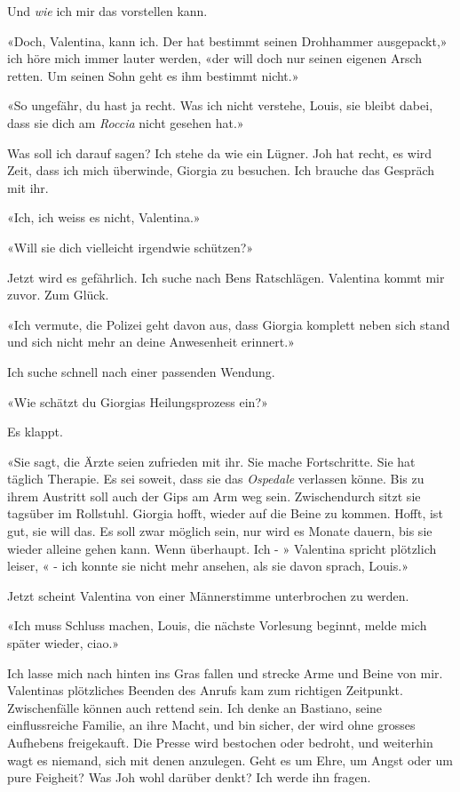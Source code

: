 Und \emph{wie} ich mir das vorstellen kann.

«Doch, Valentina, kann ich. Der hat bestimmt seinen Drohhammer
ausgepackt,» ich höre mich immer lauter werden, «der will doch nur
seinen eigenen Arsch retten. Um seinen Sohn geht es ihm bestimmt nicht.»

«So ungefähr, du hast ja recht. Was ich nicht verstehe, Louis, sie
bleibt dabei, dass sie dich am \emph{Roccia} nicht gesehen hat.»

Was soll ich darauf sagen? Ich stehe da wie ein Lügner. Joh hat recht, es wird Zeit, dass ich mich
überwinde, Giorgia zu besuchen. Ich brauche das Gespräch mit ihr.

«Ich, ich weiss es nicht, Valentina.»

«Will sie dich vielleicht irgendwie schützen?»

Jetzt wird es gefährlich. Ich suche nach Bens Ratschlägen.
Valentina kommt mir zuvor. Zum Glück.

«Ich vermute, die Polizei geht davon aus, dass Giorgia komplett neben
sich stand und sich nicht mehr an deine Anwesenheit erinnert.»

Ich suche schnell nach einer passenden Wendung.

«Wie schätzt du Giorgias Heilungsprozess ein?»

Es klappt.

«Sie sagt, die Ärzte seien zufrieden mit ihr. Sie mache Fortschritte.
Sie hat täglich Therapie. Es sei soweit, dass sie das \emph{Ospedale}
verlassen könne. Bis zu ihrem Austritt soll auch der Gips am Arm weg
sein. Zwischendurch sitzt sie tagsüber im Rollstuhl. Giorgia hofft,
wieder auf die Beine zu kommen. Hofft, ist gut, sie will das. Es soll
zwar möglich sein, nur wird es Monate dauern, bis sie wieder alleine
gehen kann. Wenn überhaupt. Ich - » Valentina spricht plötzlich leiser,
« - ich konnte sie nicht mehr ansehen, als sie davon sprach, Louis.»

Jetzt scheint Valentina von einer Männerstimme unterbrochen zu werden.

«Ich muss Schluss machen, Louis, die nächste Vorlesung beginnt, melde
mich später wieder, ciao.»

Ich lasse mich nach hinten ins Gras fallen und strecke Arme und Beine
von mir. Valentinas plötzliches Beenden des Anrufs kam zum richtigen
Zeitpunkt. Zwischenfälle können auch rettend sein.
Ich denke an Bastiano, seine einflussreiche Familie, an ihre Macht, und
bin sicher, der wird ohne grosses Aufhebens freigekauft. Die Presse
wird bestochen oder bedroht, und weiterhin wagt es niemand, sich mit
denen anzulegen. Geht es um Ehre, um Angst oder um pure Feigheit? Was
Joh wohl darüber denkt? Ich werde ihn fragen.

